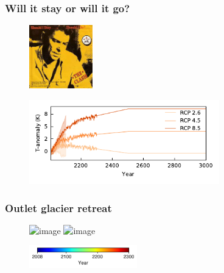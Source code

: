 \documentclass[hide notes,intlimits]{beamer}
\begin{document}
\begin{frame}
  \frametitle{Will it stay or will it go?}
  \begin{figure}
    \includegraphics[width=2.75cm]{clash}
  \end{figure}
  \begin{figure}
    \includegraphics[width=8.25cm]{giss_cmip5_delta_T}
  \end{figure}
\end{frame}



\begin{frame}
  \frametitle{Outlet glacier retreat}
  \begin{figure}
    \includegraphics<1>[height=7.25cm]{rcp45_Upernavik_Isstrom_S}
    \includegraphics<2>[height=7.25cm]{rcp45_Store_Gletscher}
  \end{figure}
  \vspace{-0.5cm}
  \begin{figure}
    \includegraphics[height=1cm]{jet_horizontal}
  \end{figure}
\end{frame}
\end{document}
